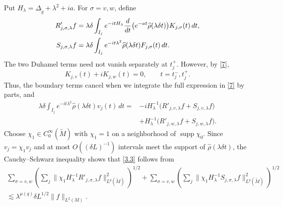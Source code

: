 \documentclass[11pt]{amsart}
\newcommand{\la}{\lambda}
\begin{document}
Put $H_\la=\Delta_{\tilde g}+\la^2+ia$. For $\sigma=v,w$, define
\begin{align}\label{eq:R-core}
R'_{j,\sigma,\la}f
&=\la\delta\int_{I_j}e^{-itH_\la}
\frac{d}{dt}\bigl(e^{-at}\widehat\rho(\la\delta t)\bigr)K_{j,\sigma}(t)\,dt,\\
S_{j,\sigma,\la}f
&=\la\delta\int_{I_j}e^{-it\la^2}\widehat\rho(\la\delta t)F_{j,\sigma}(t)\,dt.\notag
\end{align}
The two Duhamel terms need not vanish separately at $t_j^+$. However, by \eqref{7},
\[
K_{j,v}(t)+iK_{j,w}(t)=0,\qquad t=t_j^-,t_j^+.
\]
Thus, the boundary terms cancel when we integrate the full expression in \eqref{7} by parts, and
\begin{equation}\label{eq:ibp-core}
\begin{split}
\la\delta\int_{I_j}e^{-it\la^2}\widehat\rho(\la\delta t)v_j(t)\,dt
={}&-iH_\la^{-1}\bigl(R'_{j,v,\la}f+S_{j,v,\la}f\bigr)\\
&+H_\la^{-1}\bigl(R'_{j,w,\la}f+S_{j,w,\la}f\bigr).
\end{split}
\end{equation}
Choose $\chi_1\in C_0^\infty(\tilde M)$ with $\chi_1=1$ on a neighborhood of $\operatorname{supp}\chi_0$. Since $v_j=\chi_1v_j$ and at most $O((\delta L)^{-1})$ intervals meet the support of $\widehat\rho(\la\delta t)$, the Cauchy--Schwarz inequality shows that \eqref{3.3} follows from
\begin{multline}\label{3.14q}
\sum_{\sigma=v,w}\left(\sum_j\|\chi_1H_\la^{-1}R'_{j,\sigma,\la}f\|_{L^q(\tilde M)}^2\right)^{1/2}
+\sum_{\sigma=v,w}\left(\sum_j\|\chi_1H_\la^{-1}S_{j,\sigma,\la}f\|_{L^q(\tilde M)}^2\right)^{1/2}\\
\lesssim \la^{\mu(q)}\delta L^{1/2}\|f\|_{L^2(M)}.
\end{multline}
\end{document}
